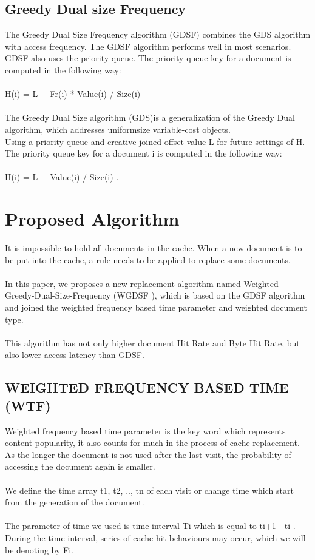 \documentclass[conference]{IEEEtran}
\begin{document}
\subsection{Greedy Dual size Frequency}
The Greedy Dual Size Frequency algorithm (GDSF) combines the GDS algorithm with access frequency. The GDSF algorithm performs well in most scenarios. GDSF also uses the priority queue. The priority queue key for a document is computed in the following way:\\ \\
H(i) = L + Fr(i) * Value(i) / Size(i) \\ \\
The Greedy Dual Size algorithm (GDS)is a generalization of the Greedy Dual algorithm, which addresses uniformsize variable-cost objects. \\
Using a priority queue and creative joined offset value L for future settings of H. The priority queue key for a document i is computed in the following way:\\ \\
H(i) = L + Value(i) / Size(i) . \\

\section{Proposed Algorithm}
It is impossible to hold all documents in the cache. When a
new document is to be put into the cache, a rule needs to be
applied to replace some documents.\\ \\
In this paper, we proposes a new replacement algorithm named Weighted Greedy-Dual-Size-Frequency (WGDSF ), which is based on the GDSF algorithm and joined the weighted frequency based time parameter and weighted document type. \\
\\ This algorithm has not only higher document Hit Rate and Byte Hit Rate, but also lower access latency than GDSF.

\subsection{WEIGHTED FREQUENCY BASED TIME (WTF) }
Weighted frequency based time parameter is the key word which represents content popularity, it also counts for much in the process of cache replacement. As the longer the document is not used after the last visit, the probability of accessing the document again is smaller.\\
\\
We define the time array t1, t2, .., tn of each visit or change time which start from the generation of the document.\\ \\ 
The parameter of time we used is time interval Ti which is equal to  ti+1 - ti .
During the time interval, series of cache hit behaviours may occur, which we will be denoting by Fi.\\  
\\
\end{document}
